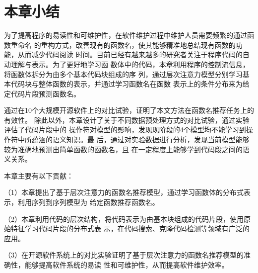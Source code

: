 \section{本章小结}
为了提高程序的易读性和可维护性，在软件维护过程中维护人员需要频繁的通过函数重命名
的重构方式，改善现有的函数名，使其能够精准地总结现有函数的功能，从而减少代码阅读
时间。目前已经有越来越多的研究者关注于程序代码的自动理解与表示。为了更好地学习函
数体中的代码，本章利用程序的控制流信息，将函数体拆分为由多个基本代码块组成的序
列，通过层次注意力模型分别学习基本代码块与整体函数的表示，并通过学习函数名在函数
表示上的条件分布来为给定代码片段预测函数名。

通过在10个大规模开源软件上的对比试验，证明了本文方法在函数名推荐任务上的有效性。
除此以外，本章设计了关于不同数据预处理方式的对比试验，通过实验评估了代码片段中的
操作符对模型的影响，发现现阶段的4个模型均不能学习到操作符中所蕴涵的语义知识。最
后，通过对实验数据进行分析，发现当前模型能够较为准确地预测出简单函数的函数名，且
在一定程度上能够学到代码段之间的语义关系。

本章主要有以下贡献：

（1）本章提出了基于层次注意力的函数名推荐模型，通过学习函数体的分布式表示，利用序列到序列模型为
给定函数推荐函数名。

（2）本章利用代码的层次结构，将代码表示为由基本块组成的代码片段，使用原始特征学习代码片段的分布式表
示，在代码搜索、克隆代码检测等领域有广泛的应用。

（3）在开源软件系统上的对比实验证明了基于层次注意力的函数名推荐模型的准确性，能够提高软件系统的易读
性和可维护性，从而提高软件维护效率。